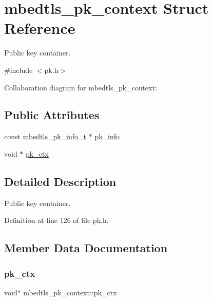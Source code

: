 \hypertarget{structmbedtls__pk__context}{}\section{mbedtls\+\_\+pk\+\_\+context Struct Reference}
\label{structmbedtls__pk__context}


Public key container.  




{\ttfamily \#include $<$pk.\+h$>$}



Collaboration diagram for mbedtls\+\_\+pk\+\_\+context\+:
\subsection*{Public Attributes}
\begin{DoxyCompactItemize}
\item 
const \mbox{\hyperlink{structmbedtls__pk__info__t}{mbedtls\+\_\+pk\+\_\+info\+\_\+t}} $\ast$ \mbox{\hyperlink{structmbedtls__pk__context_a3dac25bf08a411a2479107e14fa90550}{pk\+\_\+info}}
\item 
void $\ast$ \mbox{\hyperlink{structmbedtls__pk__context_aa6a3a0dbdf30848261eaf687a6368af4}{pk\+\_\+ctx}}
\end{DoxyCompactItemize}


\subsection{Detailed Description}
Public key container. 

Definition at line 126 of file pk.\+h.



\subsection{Member Data Documentation}
\mbox{\label{structmbedtls__pk__context_aa6a3a0dbdf30848261eaf687a6368af4}} 
\subsubsection{\texorpdfstring{pk\+\_\+ctx}{pk\_ctx}}
{\footnotesize\ttfamily void$\ast$ mbedtls\+\_\+pk\+\_\+context\+::pk\+\_\+ctx}

